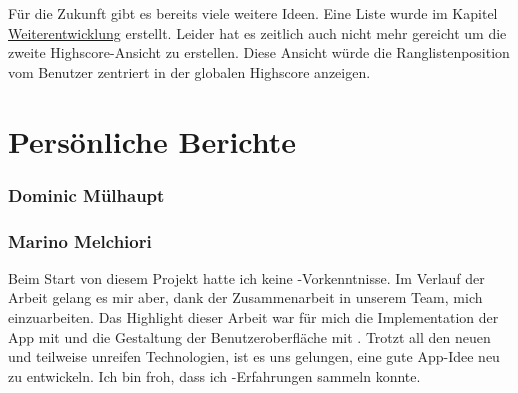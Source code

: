 Für die Zukunft gibt es bereits viele weitere Ideen. 
Eine Liste wurde im Kapitel \hyperref[pd-resultate-weiterentwicklung]{Weiterentwicklung} erstellt. 
Leider hat es zeitlich auch nicht mehr gereicht um die zweite Highscore-Ansicht zu erstellen. 
Diese Ansicht würde die Ranglistenposition vom Benutzer zentriert in der globalen Highscore anzeigen. 

\section{Persönliche Berichte}

\subsubsection{Dominic Mülhaupt}

\subsubsection{Marino Melchiori}
Beim Start von diesem Projekt hatte ich keine -Vorkenntnisse.
Im Verlauf der Arbeit gelang es mir aber, dank der Zusammenarbeit in unserem Team, mich einzuarbeiten.
Das Highlight dieser Arbeit war für mich die Implementation der App mit  und die Gestaltung der Benutzeroberfläche mit .
Trotzt all den neuen und teilweise unreifen Technologien, ist es uns gelungen, eine gute App-Idee neu zu entwickeln.
Ich bin froh, dass ich -Erfahrungen sammeln konnte.